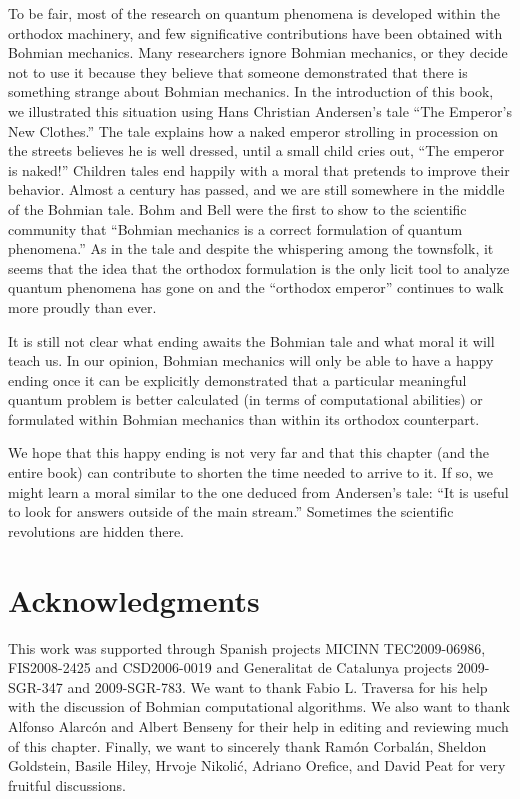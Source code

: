 \documentclass[onecolumn,nofootinbib, secnumarabic, amsmath, nobibnotes,11pt,aps,pra]{revtex4-1}
\begin{document}
To be fair, most of the research on quantum phenomena is developed
within the orthodox machinery, and few significative contributions
have been obtained with Bohmian mechanics. Many researchers ignore
Bohmian mechanics, or they decide not to use it because they believe
that someone demonstrated that there is something strange about
Bohmian mechanics. In the introduction of this book, we illustrated
this situation using Hans Christian Andersen's tale ``The Emperor's
New Clothes.'' The tale explains how a naked emperor strolling in
procession on the streets believes he is well dressed, until a small
child cries out, ``The emperor is naked!'' Children tales end
happily with a moral that pretends to improve their behavior. Almost
a century has passed, and we are still somewhere in the middle of
the Bohmian tale. Bohm and Bell were the first to show to the
scientific community that ``Bohmian mechanics is a correct
formulation of quantum phenomena.'' As in the tale and despite the
whispering among the townsfolk, it seems that the idea that the
orthodox formulation is the only licit tool to analyze quantum
phenomena has gone on and the ``orthodox emperor'' continues to walk
more proudly than ever.

It is still not clear what ending awaits the Bohmian tale and what
moral it will teach us. In our opinion, Bohmian mechanics will only
be able to have a happy ending once it can be explicitly
demonstrated that a particular  meaningful quantum problem is better calculated
(in terms of computational abilities) or formulated within Bohmian
mechanics than within its orthodox counterpart.

We hope that this happy ending is not very far and that this chapter (and the entire book) can contribute to shorten the time needed to arrive to it. If so, we might learn a moral similar to the one deduced from Andersen's tale: ``It is useful to look for answers outside of the main stream.'' Sometimes the scientific revolutions are hidden there.\vspace*{-9pt}\\


\section*{Acknowledgments}

This work was supported through Spanish projects MICINN
TEC2009-06986, FIS2008-2425 and CSD2006-0019 and Generalitat de
Catalunya projects 2009-SGR-347 and 2009-SGR-783. We want to thank
Fabio L. Traversa for his help with the discussion of Bohmian
computational algorithms. We also want to thank Alfonso Alarc\'{o}n and
Albert Benseny for their help in editing and reviewing much of this
chapter. Finally, we want to sincerely thank Ram\'on Corbal\'an,
Sheldon Goldstein, Basile Hiley, Hrvoje Nikoli\'c, Adriano Orefice,
and David Peat for very fruitful discussions.\vspace*{-9pt}\\
\end{document}
